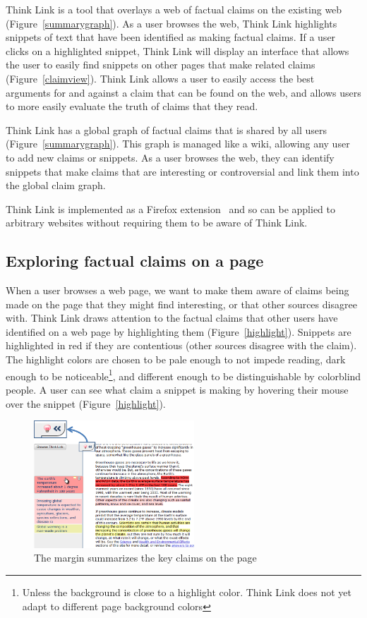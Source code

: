\documentclass{chi2009}
\begin{document}
Think Link is a tool that overlays a web of factual claims on the existing web (Figure~\ref{summarygraph}). As a user browses the web, Think Link highlights snippets of text that have been identified as making factual claims. If a user clicks on a highlighted snippet, Think Link will display an interface that allows the user to easily find snippets on other pages that make related claims (Figure~\ref{claimview}). Think Link allows a user to easily access the best arguments for and against a claim that can be found on the web, and allows users to more easily evaluate the truth of claims that they read.

Think Link has a global graph of factual claims that is shared by all users (Figure~\ref{summarygraph}). This graph is managed like a wiki, allowing any user to add new claims or snippets. As a user browses the web, they can identify snippets that make claims that are interesting or controversial and link them into the global claim graph. 

Think Link is implemented as a Firefox extension~\cite{firefoxextend} and so can be applied to arbitrary websites without requiring them to be aware of Think Link.


\subsection{Exploring factual claims on a page}

When a user browses a web page, we want to make them aware of claims being made on the page that they might find interesting, or that other sources disagree with. Think Link draws attention to the factual claims that other users have identified on a web page by highlighting them (Figure~\ref{highlight}). Snippets are highlighted in red if they are contentious (other sources disagree with the claim). The highlight colors are chosen to be pale enough to not impede reading, dark enough to be noticeable\footnote{Unless the background is close to a highlight color. Think Link does not yet adapt to different page background colors}, and different enough to be distinguishable by colorblind people.
A user can see what claim a snippet is making by hovering their mouse over the snippet (Figure~\ref{highlight}).

\begin{figure}[tb]
	\begin{center}
	\includegraphics[width=6cm]{../screenshots/sidebar_diagram.png}
	\caption{The margin summarizes the key claims on the page}
	\label{margin}
	\end{center}
\end{figure}
\end{document}
